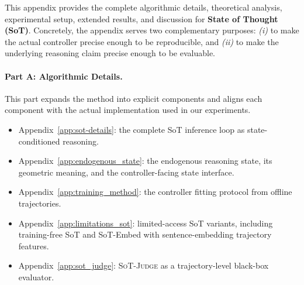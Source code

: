 \clearpage
\onecolumn

\providecommand{\AppBlock}[1]{%
    \vspace{1.0em}
    \noindent{\LARGE\bfseries #1}\par
    \vspace{0.6em}
}

\providecommand{\AppPlaceholder}[2]{%
    \fbox{
        \begin{minipage}[c][#1][c]{0.94\textwidth}
            \centering
            \textit{#2}
        \end{minipage}
    }
}

\AppBlock{Appendix Overview}
\label{app:overview}

This appendix provides the complete algorithmic details, theoretical analysis, experimental setup, extended results, and discussion for \textbf{State of Thought (SoT)}.
Concretely, the appendix serves two complementary purposes:
\emph{(i)} to make the actual controller precise enough to be reproducible, and
\emph{(ii)} to make the underlying reasoning claim precise enough to be evaluable.

\paragraph{Part A: Algorithmic Details.}
This part expands the method into explicit components and aligns each component with the actual implementation used in our experiments.
\begin{itemize}[leftmargin=1.6em]
    \item Appendix~\ref{app:sot-details}: the complete SoT inference loop as state-conditioned reasoning.
    \item Appendix~\ref{app:endogenous_state}: the endogenous reasoning state, its geometric meaning, and the controller-facing state interface.
    \item Appendix~\ref{app:training_method}: the controller fitting protocol from offline trajectories.
    \item Appendix~\ref{app:limitations_sot}: limited-access SoT variants, including training-free SoT and SoT-Embed with sentence-embedding trajectory features.
    \item Appendix~\ref{app:sot_judge}: \textsc{SoT-Judge} as a trajectory-level black-box evaluator.
\end{itemize}


